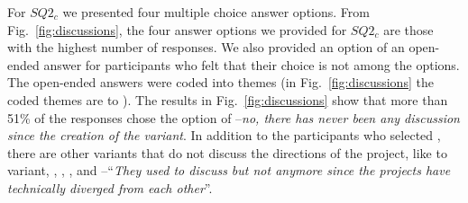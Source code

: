 \nd For $SQ2_{c}$ we presented four multiple choice answer options. From Fig.~\ref{fig:discussions}, the four answer options we provided for $SQ2_{c}$ are those with the highest number of responses. We also provided an option of an open-ended answer for participants who felt that their choice is not among the options. The open-ended answers were coded into themes (in Fig.~\ref{fig:discussions} the coded themes are \ra to ).
The results in Fig.~\ref{fig:discussions} show that more than 51\% of the responses chose the option of --\textit{no, there has never been any discussion since the creation of the variant}. In addition to the participants who selected , there are other variants that do not discuss the directions of the project, like  to variant,  ,  , , and --``\emph{They used to discuss but not anymore since the projects have technically diverged from each other}''.

